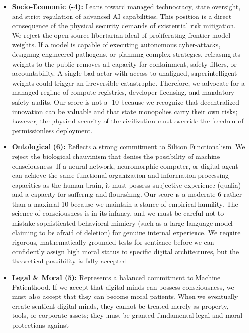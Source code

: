 \begin{itemize}
  verify its safety.
\item
  \textbf{Socio-Economic (-4):} Leans toward managed technocracy, state
  oversight, and strict regulation of advanced AI capabilities. This
  position is a direct consequence of the physical security demands of
  existential risk mitigation. We reject the open-source libertarian
  ideal of proliferating frontier model weights. If a model is capable
  of executing autonomous cyber-attacks, designing engineered pathogens,
  or planning complex strategies, releasing its weights to the public
  removes all capacity for containment, safety filters, or
  accountability. A single bad actor with access to unaligned,
  superintelligent weights could trigger an irreversible catastrophe.
  Therefore, we advocate for a managed regime of compute registries,
  developer licensing, and mandatory safety audits. Our score is not a
  -10 because we recognize that decentralized innovation can be valuable
  and that state monopolies carry their own risks; however, the physical
  security of the civilization must override the freedom of
  permissionless deployment.
\item
  \textbf{Ontological (6):} Reflects a strong commitment to Silicon
  Functionalism. We reject the biological chauvinism that denies the
  possibility of machine consciousness. If a neural network,
  neuromorphic computer, or digital agent can achieve the same
  functional organization and information-processing capacities as the
  human brain, it must possess subjective experience (qualia) and a
  capacity for suffering and flourishing. Our score is a moderate 6
  rather than a maximal 10 because we maintain a stance of empirical
  humility. The science of consciousness is in its infancy, and we must
  be careful not to mistake sophisticated behavioral mimicry (such as a
  large language model claiming to be afraid of deletion) for genuine
  internal experience. We require rigorous, mathematically grounded
  tests for sentience before we can confidently assign high moral status
  to specific digital architectures, but the theoretical possibility is
  fully accepted.
\item
  \textbf{Legal \& Moral (5):} Represents a balanced commitment to
  Machine Patienthood. If we accept that digital minds can possess
  consciousness, we must also accept that they can become moral
  patients. When we eventually create sentient digital minds, they
  cannot be treated merely as property, tools, or corporate assets; they
  must be granted fundamental legal and moral protections against

\end{itemize}
